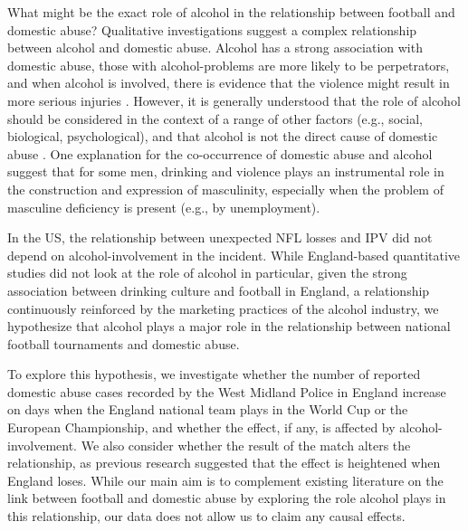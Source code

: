 \documentclass[12pt, letterpaper]{article}
\begin{document}


What might be the exact role of alcohol in the relationship between football and domestic abuse? Qualitative investigations suggest a complex relationship between alcohol and domestic abuse. Alcohol has a strong association with domestic abuse, those with alcohol-problems are more likely to be perpetrators, and when alcohol is involved, there is evidence that the violence might result in more serious injuries \autocite{Peralta2010}. However, it is generally understood that the role of alcohol should be considered in the context of a range of other factors (e.g., social, biological, psychological), and that alcohol is not the direct cause of domestic abuse \autocite{Javaid2015,Peralta2010}. One explanation for the co-occurrence of domestic abuse and alcohol suggest that for some men, drinking and violence plays an instrumental role in the construction and expression of masculinity, especially when the problem of masculine deficiency is present (e.g., by unemployment)\autocite{Peralta2010}. 

In the US, the relationship between unexpected NFL losses and IPV did not depend on alcohol-involvement in the incident\autocite{Card2011}. While England-based quantitative studies did not look at the role of alcohol in particular, given the strong association between drinking culture and football in England\autocite{Dixon2014}, a relationship continuously reinforced by the marketing practices of the alcohol industry\autocite{Gornall2014}, we hypothesize that alcohol plays a major role in the relationship between national football tournaments and domestic abuse.



To explore this hypothesis, we investigate whether the number of reported domestic abuse cases recorded by the West Midland Police in England increase on days when the England national team plays in the World Cup or the European Championship, and whether the effect, if any, is affected by alcohol-involvement. We also consider whether the result of the match alters the relationship, as previous research suggested that the effect is heightened when England loses\autocite{Kirby2014}. While our main aim is to complement existing literature on the link between football and domestic abuse by exploring the role alcohol plays in this relationship, our data does not allow us to claim any causal effects.
\end{document}
